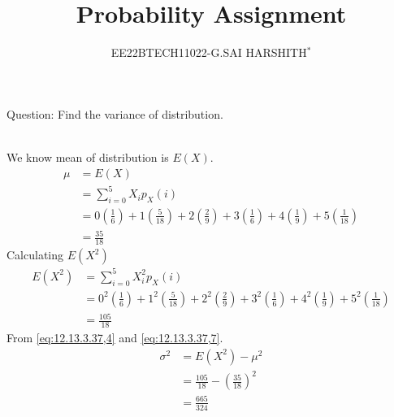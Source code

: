 \documentclass[journal,12pt,twocolumn]{IEEEtran}
\theoremstyle{remark}
\begin{document}

\vspace{3cm}

\title{Probability Assignment}
\author{EE22BTECH11022-G.SAI HARSHITH$^{*}$%
}
\maketitle
\newpage
\bigskip
\renewcommand{\thefigure}{\theenumi}
\renewcommand{\thetable}{\theenumi}

Question: Find the variance of distribution.
\begin{table}[!ht]
	
\end{table}\\
\solution
We know mean of distribution is $E(X)$.
\begin{align}
\mu&=E(X)\\
&=\sum_{i=0}^{5} X_ip_X(i)\\
&=0\left(\frac{1}{6}\right)+1\left(\frac{5}{18}\right)+2\left(\frac{2}{9}\right)+3\left(\frac{1}{6}\right)+4\left(\frac{1}{9}\right)+5\left(\frac{1}{18}\right)\\
&=\frac{35}{18}
\label{eq:12.13.3.37,4}
\end{align}
Calculating $E(X^2)$
\begin{align}
E(X^2)&=\sum_{i=0}^{5} X_i^2p_X(i)\\
&=0^2\left(\frac{1}{6}\right)+1^2\left(\frac{5}{18}\right)+2^2\left(\frac{2}{9}\right)+3^2\left(\frac{1}{6}\right)+4^2\left(\frac{1}{9}\right)+5^2\left(\frac{1}{18}\right)\\
&=\frac{105}{18}
\label{eq:12.13.3.37,7}
\end{align}
From \eqref{eq:12.13.3.37,4} and \eqref{eq:12.13.3.37,7}.
\begin{align}
\sigma^2&=E(X^2)-\mu^2\\
&=\frac{105}{18}-\left(\frac{35}{18}\right)^2\\
&=\frac{665}{324}
\end{align}
\end{document}

